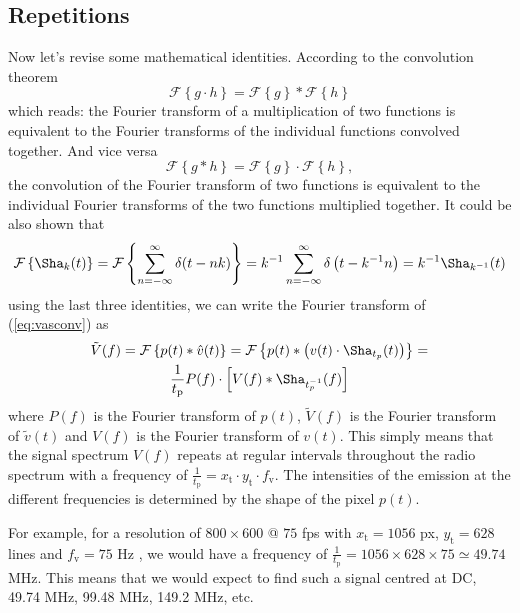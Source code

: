 \documentclass[a4paper,12pt,twoside,openright]{report}
\begin{document}
\subsection{Repetitions}
Now let's revise some mathematical identities. According to the convolution theorem \cite{arfkenconvolution}
\begin{equation}
\mathcal{F} \left\{ g \cdot h \right\} = \mathcal{F} \left\{ g \right\} \ast  \mathcal{F} \left\{ h \right\}
\end{equation}
which reads: the Fourier transform of a multiplication of two functions is equivalent to the Fourier transforms of the individual functions convolved together. And vice versa
\begin{equation}
\mathcal{F} \left\{ g \ast h \right\} = \mathcal{F} \left\{ g \right\} \cdot  \mathcal{F} \left\{ h \right\} ,
\end{equation}
the convolution of the Fourier transform of two functions is equivalent to the individual Fourier transforms of the two functions multiplied together.
It could be also shown that
\begin{equation}
\mathcal{F} \left\{ \Sha_{k} (t) \right\} = 
\mathcal{F} \left\{ \sum\limits_{n=-\infty}^{\infty}  \delta(t-n k) \right\} =
k^{-1} \sum\limits_{n=-\infty}^{\infty}  \delta \left( t-k^{-1} n \right) =
k^{-1} \Sha_{k^{-1}}(t)
\end{equation}
using the last three identities, we can write the Fourier transform of (\ref{eq:vasconv}) as
\begin{multline} 
\label{eq:vspectrum}
\tilde{V}(f) = \mathcal{F} \left\{ p(t) \ast \hat{v}(t) \right\} = \mathcal{F} \left\{ p(t) \ast \left( v(t) \cdot \Sha_{t_{p}}(t) \right) \right\} = \\
\frac{1}{t_\text{p}} P(f) \cdot  \left[ V(f) \ast
\Sha_{t_{p}^{-1}}(f)  \right]
\end{multline}
where $P(f)$ is the Fourier transform of $p(t)$, $\tilde{V}(f)$ is the Fourier transform of $\tilde{v}(t)$ and $V(f)$ is the Fourier transform of $v(t)$. This simply means that the signal spectrum $V(f)$ repeats at regular intervals throughout the radio spectrum with a frequency of $\frac{1}{t_\text{p}} = x_\text{t} \cdot y_\text{t} \cdot f_\text{v}$. The intensities of the emission at the different frequencies is determined by the shape of the pixel $p(t)$.

For example, for a resolution of $800 \times 600 $ @ $ 75$ fps with $x_\text{t} = 1056$ px, $y_\text{t} = 628$ lines and $f_\text{v} = 75$ Hz , we would have a frequency of $\frac{1}{t_\text{p}} = 1056 \times 628 \times 75 \simeq 49.74$ MHz. This means that we would expect to find such a signal centred at DC, 49.74 MHz, 99.48 MHz, 149.2 MHz, etc.
\end{document}
